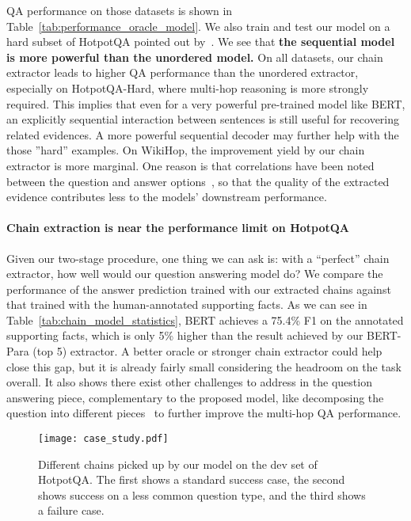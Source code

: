 \documentclass[11pt,a4paper]{article}
\begin{document}
QA performance on those datasets is shown in Table~\ref{tab:performance_oracle_model}. We also train and test our model on a hard subset of HotpotQA pointed out by~. We see that \textbf{the sequential model is more powerful than the unordered model.} On all datasets, our chain extractor leads to higher QA performance than the unordered extractor, especially on HotpotQA-Hard, where multi-hop reasoning is more strongly required. This implies that even for a very powerful pre-trained model like BERT, an explicitly sequential interaction between sentences is still useful for recovering related evidences. A more powerful sequential decoder may further help with the those ''hard'' examples. On WikiHop, the improvement yield by our chain extractor is more marginal. One reason is that correlations have been noted between the question and answer options~\citep{chen2019understanding}, so that the quality of the extracted evidence contributes less to the models' downstream performance. 











\paragraph{Chain extraction is near the performance limit on HotpotQA} Given our two-stage procedure, one thing we can ask is: with a ``perfect'' chain extractor, how well would our question answering model do? We compare the performance of the answer prediction trained with our extracted chains against that trained with the human-annotated supporting facts. As we can see in Table~\ref{tab:chain_model_statistics}, BERT achieves a 75.4\% F1 on the annotated supporting facts, which is only 5\% higher than the result achieved by our BERT-Para (top 5) extractor. A better oracle or stronger chain extractor could help close this gap, but it is already fairly small considering the headroom on the task overall. It also shows there exist other challenges to address in the question answering piece, complementary to the proposed model, like decomposing the question into different pieces~\citep{MinZZH19} to further improve the multi-hop QA performance.

\begin{figure*}[t]
\centering
\texttt{[image: case\_study.pdf]}
\caption{Different chains picked up by our model on the dev set of HotpotQA. The first shows a standard success case, the second shows success on a less common question type, and the third shows a failure case.}
\vspace{-0.5cm}
    \label{fig:case_study}
\end{figure*}
\end{document}
